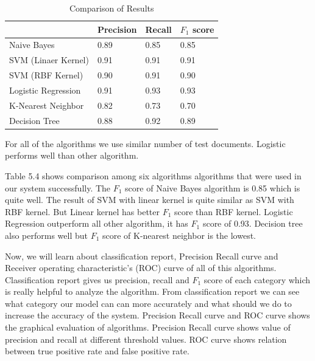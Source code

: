 \documentclass[12pt,a4paper]{report}
\begin{document}
\begin{table}[h!]
\begin{center}
\caption{Comparison of Results}
\begin{tabular}{|m{6.8cm} | m{2cm}| m{2cm}| m{2cm}|}
\hline
     & Precision & Recall & $F_1$ score \\
\hline
    Naive Bayes & 0.89 & 0.85 & 0.85\\
\hline 
    SVM (Linaer Kernel) & 0.91 & 0.91 & 0.91\\
\hline 
    SVM (RBF Kernel) & 0.90 & 0.91 & 0.90\\
\hline 
    Logistic Regression & 0.91 & 0.93 & 0.93\\
\hline
    K-Nearest Neighbor & 0.82 & 0.73 & 0.70\\
\hline
    Decision Tree & 0.88 & 0.92 & 0.89\\
\hline
\end{tabular}
\end{center}
\end{table}
\noindent
For all of the algorithms we use similar number of test documents. Logistic performs well than other algorithm.
\par
\vspace{0.5cm}
\noindent
Table 5.4 shows comparison among six algorithms algorithms that were used in our system successfully. The $F_1$ score of Naive Bayes algorithm is 0.85 which is quite well. The result of SVM with linear kernel is quite similar as SVM with RBF kernel. But Linear kernel has better $F_1$ score than RBF kernel. Logistic Regression outperform all other algorithm, it has $F_1$ score of 0.93. Decision tree also performs well but $F_1$ score of K-nearest neighbor is the lowest.

\par
\vspace{0.5cm}
\noindent
Now, we will learn about classification report, Precision Recall curve and Receiver operating characteristic's (ROC) curve of  all of this algorithms. Classification report gives us precision, recall and $F_1$ score of each category which is really helpful to analyze the algorithm. From classification report we can see what category our model can can more accurately and what should we do to increase the accuracy of the system. Precision Recall curve and ROC curve shows the graphical evaluation of algorithms. Precision Recall curve shows value of precision and recall at different threshold values. ROC curve shows relation between true positive rate and false positive rate. 
\clearpage
\end{document}
